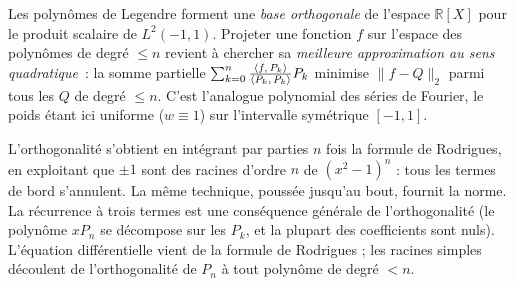 \begin{significationintuitive}
Les polynômes de Legendre forment une \emph{base orthogonale} de l'espace
$\mathbb{R}[X]$ pour le produit scalaire de $L^2(-1,1)$. Projeter une fonction
$f$ sur l'espace des polynômes de degré $\leq n$ revient à chercher sa
\emph{meilleure approximation au sens quadratique}~: la somme partielle
$\sum_{k=0}^{n}\frac{\langle f,\,P_k\rangle}{\langle P_k,\,P_k\rangle}P_k$ minimise
$\|f-Q\|_2$ parmi tous les $Q$ de degré $\leq n$. C'est l'analogue
polynomial des séries de Fourier, le poids étant ici uniforme ($w\equiv 1$)
sur l'intervalle symétrique $[-1,1]$.
\end{significationintuitive}

\decsep{}


\begin{ideepreuve}
L'orthogonalité s'obtient en intégrant par parties $n$ fois la formule de
Rodrigues, en exploitant que $\pm 1$ sont des racines d'ordre $n$ de
${(x^2-1)}^n$ : tous les termes de bord s'annulent. La même technique, poussée
jusqu'au bout, fournit la norme. La récurrence à trois termes est une
conséquence générale de l'orthogonalité (le polynôme $x P_n$ se décompose sur
les $P_k$, et la plupart des coefficients sont nuls). L'équation différentielle
vient de la formule de Rodrigues ; les racines simples découlent de
l'orthogonalité de $P_n$ à tout polynôme de degré $<n$.
\end{ideepreuve}

\vspace{10pt}

